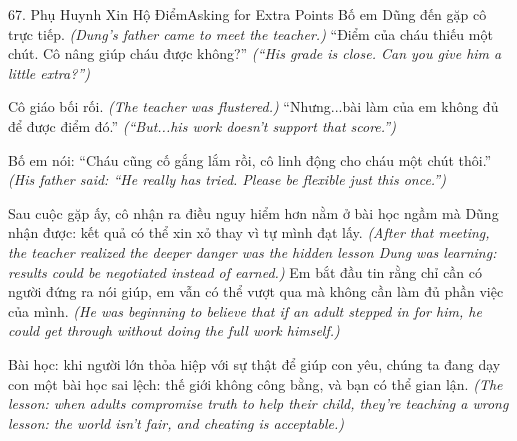 \begin{truyen}{67. Phụ Huynh Xin Hộ Điểm}{Asking for Extra Points}
Bố em Dũng đến gặp cô trực tiếp.
\textit{(Dung's father came to meet the teacher.)}
``Điểm của cháu thiếu một chút. Cô nâng giúp cháu được không?''
\textit{(``His grade is close. Can you give him a little extra?'')}

Cô giáo bối rối.
\textit{(The teacher was flustered.)}
``Nhưng...bài làm của em không đủ để được điểm đó.''
\textit{(``But...his work doesn't support that score.'')}

Bố em nói: ``Cháu cũng cố gắng lắm rồi, cô linh động cho cháu một chút thôi.''
\textit{(His father said: ``He really has tried. Please be flexible just this once.'')}

Sau cuộc gặp ấy, cô nhận ra điều nguy hiểm hơn nằm ở bài học ngầm mà Dũng nhận được: kết quả có thể xin xỏ thay vì tự mình đạt lấy.
\textit{(After that meeting, the teacher realized the deeper danger was the hidden lesson Dung was learning: results could be negotiated instead of earned.)}
Em bắt đầu tin rằng chỉ cần có người đứng ra nói giúp, em vẫn có thể vượt qua mà không cần làm đủ phần việc của mình.
\textit{(He was beginning to believe that if an adult stepped in for him, he could get through without doing the full work himself.)}

Bài học: khi người lớn thỏa hiệp với sự thật để giúp con yêu, chúng ta đang dạy con một bài học sai lệch: thế giới không công bằng, và bạn có thể gian lận.
\textit{(The lesson: when adults compromise truth to help their child, they're teaching a wrong lesson: the world isn't fair, and cheating is acceptable.)}
\end{truyen}

